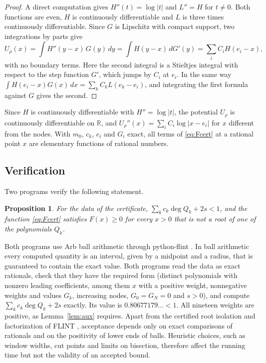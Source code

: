 \documentclass[11pt]{amsart}
\newtheorem{proposition}[theorem]{Proposition}
\theoremstyle{remark}
\numberwithin{equation}{section}
\newcommand{\R}{\mathbb{R}}
\newcommand{\Budget}{0.80677179}
\begin{document}
\begin{proof}
A direct computation gives $H''(t)=\log|t|$ and $L''=H$ for $t\ne0$. Both functions are even, $H$ is continuously differentiable and $L$ is three times continuously differentiable. Since $G$ is Lipschitz with compact support, two integrations by parts give
\[
U_\rho(x)=\int H''(y-x)\,G(y)\,dy=\int H(y-x)\,dG'(y)=\sum_iC_iH(e_i-x),
\]
with no boundary terms. Here the second integral is a Stieltjes integral with respect to the step function $G'$, which jumps by $C_i$ at $e_i$. In the same way $\int H(e_i-x)G(x)\,dx=\sum_kC_kL(e_k-e_i)$, and integrating the first formula against $G$ gives the second.
\end{proof}

Since $H$ is continuously differentiable with $H''=\log|t|$, the potential $U_\rho$ is continuously differentiable on $\R$, and $U_\rho''(x)=\sum_iC_i\log|x-e_i|$ for $x$ different from the nodes. With $m_0$, $c_k$, $e_i$ and $G_i$ exact, all terms of \eqref{eq:Fcert} at a rational point $x$ are elementary functions of rational numbers.

\subsection{Verification}
Two programs verify the following statement.

\begin{proposition}\label{prop:check}
For the data of the certificate, $\sum_kc_k\deg Q_k+2s<1$, and the function \eqref{eq:Fcert} satisfies $F(x)\ge0$ for every $x>0$ that is not a root of one of the polynomials $Q_k$.
\end{proposition}

Both programs use Arb ball arithmetic \cite{Joh17} through python-flint \cite{pyflint}. In ball arithmetic every computed quantity is an interval, given by a midpoint and a radius, that is guaranteed to contain the exact value. Both programs read the data as exact rationals, check that they have the required form (distinct polynomials with nonzero leading coefficients, among them $x$ with a positive weight, nonnegative weights and values $G_k$, increasing nodes, $G_0=G_N=0$ and $s>0$), and compute $\sum_kc_k\deg Q_k+2s$ exactly. Its value is $\Budget\ldots<1$. All nineteen weights are positive, as Lemma~\ref{lem:aux} requires. Apart from the certified root isolation and factorization of FLINT \cite{FLINT}, acceptance depends only on exact comparisons of rationals and on the positivity of lower ends of balls. Heuristic choices, such as window widths, cut points and limits on bisection, therefore affect the running time but not the validity of an accepted bound.
\end{document}
